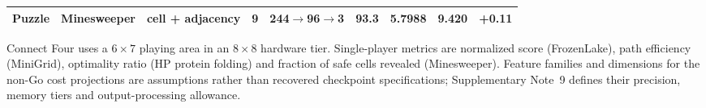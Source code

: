 \begin{table}[!htbp]
{\begin{tabular}{ll l c c c cc c}
Puzzle & Minesweeper & cell + adjacency & 9 & 244$\to$96$\to$3 & 93.3 & 5.7988 & 9.420 & +0.11 \\
\bottomrule
\end{tabular}%
}
\par\vspace{0.3em}
{\scriptsize Connect Four uses a $6\times7$ playing area in an $8\times8$ hardware tier. Single-player metrics are normalized score (FrozenLake), path efficiency (MiniGrid), optimality ratio (HP protein folding) and fraction of safe cells revealed (Minesweeper). Feature families and dimensions for the non-Go cost projections are assumptions rather than recovered checkpoint specifications; Supplementary Note~9 defines their precision, memory tiers and output-processing allowance.}
\endgroup
\end{table}
